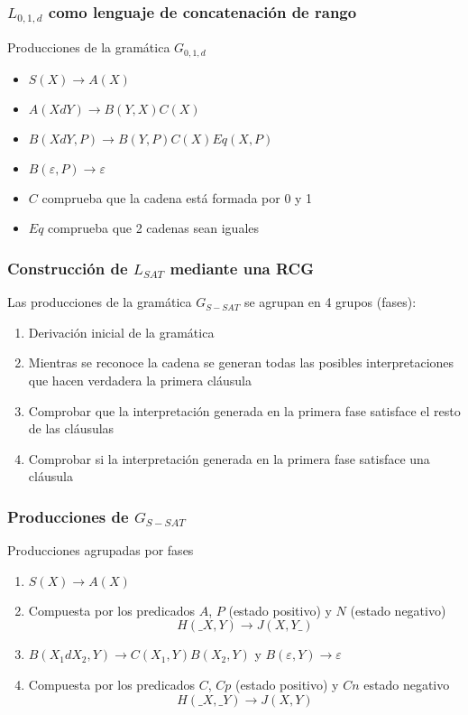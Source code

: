 \documentclass{beamer}
\begin{document}
\begin{frame}
    \frametitle{$L_{0,1,d}$ como lenguaje de concatenación de rango}

    Producciones de la gramática $G_{0,1,d}$
    \begin{itemize}
        \item $S(X)\to A(X)$
        \item $A(XdY)\to B(Y,X)C(X)$
        \item $B(XdY,P)\to B(Y,P) C(X) Eq(X,P)$
        \item $B(\varepsilon,P)\to \varepsilon$
    \end{itemize}
    \vspace{0.5cm}
    \begin{itemize}
        \item $C$ comprueba que la cadena está formada por 0 y 1
        \item $Eq$ comprueba que 2 cadenas sean iguales
    \end{itemize}
\end{frame}

\begin{frame}
    \frametitle{Construcción de $L_{SAT}$ mediante una RCG}

    Las producciones de la gramática $G_{S-SAT}$ se agrupan en 4 grupos (fases):

    \begin{enumerate}
        \item Derivación inicial de la gramática
        \item Mientras se reconoce la cadena se generan todas las posibles interpretaciones
              que hacen verdadera la primera cláusula
        \item Comprobar que la interpretación generada en la primera fase satisface el resto de las cláusulas
        \item Comprobar si la interpretación generada en la primera fase satisface una cláusula
    \end{enumerate}

\end{frame}

\begin{frame}
    \frametitle{Producciones de $G_{S-SAT}$}

    Producciones agrupadas por fases
    \begin{enumerate}
        \item $S(X)\to A(X)$
        \item Compuesta por los predicados $A$, $P$ (estado positivo) y $N$ (estado negativo)
              $$H(\_X,Y)\to J(X,Y\_)$$
        \item $B(X_1dX_2,Y)\to C(X_1,Y) B(X_2,Y)$ y $B(\varepsilon,Y)\to\varepsilon$
        \item Compuesta por los predicados $C$, $Cp$ (estado positivo) y $Cn$ estado negativo\\
              $$H(\_X,\_Y)\to J(X,Y)$$

    \end{enumerate}

\end{frame}
\end{document}
